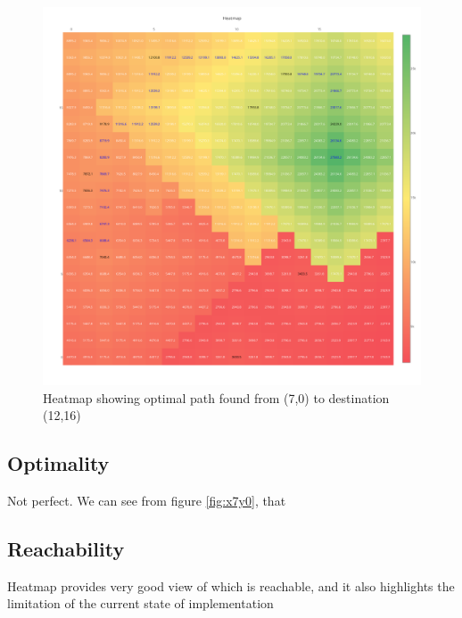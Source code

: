 \documentclass[10pt,twocolumn,letterpaper]{article}
\begin{document}
\begin{figure}[H]
\begin{center}
\includegraphics[scale=0.24]{x7y0}
\end{center}
  \caption{Heatmap showing optimal path found from (7,0) to destination (12,16)}
\label{fig:x7y0}
\label{fig:onecol}
\end{figure}


\subsection{Optimality}
Not perfect. We can see from figure \ref{fig:x7y0}, that 

\subsection{Reachability}
Heatmap provides very good view of which is reachable, and it also highlights the limitation of the current state of implementation
\end{document}
